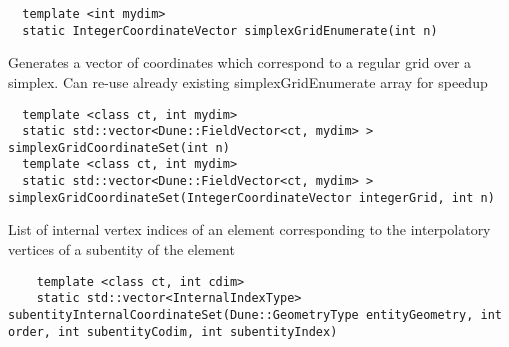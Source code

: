 \begin{mybox}
\begin{lstlisting}
  template <int mydim>
  static IntegerCoordinateVector simplexGridEnumerate(int n)
\end{lstlisting}
\end{mybox}

\noindent
Generates a vector of coordinates which correspond to a regular grid over a simplex. Can re-use already existing simplexGridEnumerate array for speedup \\

\begin{mybox}
\begin{lstlisting}
  template <class ct, int mydim>
  static std::vector<Dune::FieldVector<ct, mydim> > simplexGridCoordinateSet(int n)
  template <class ct, int mydim>
  static std::vector<Dune::FieldVector<ct, mydim> > simplexGridCoordinateSet(IntegerCoordinateVector integerGrid, int n)
\end{lstlisting}
\end{mybox}


\noindent
List of internal vertex indices of an element corresponding to the interpolatory vertices of a subentity of the element

\begin{mybox}
\begin{lstlisting}
    template <class ct, int cdim>
    static std::vector<InternalIndexType> subentityInternalCoordinateSet(Dune::GeometryType entityGeometry, int order, int subentityCodim, int subentityIndex)
\end{lstlisting}
\end{mybox}

